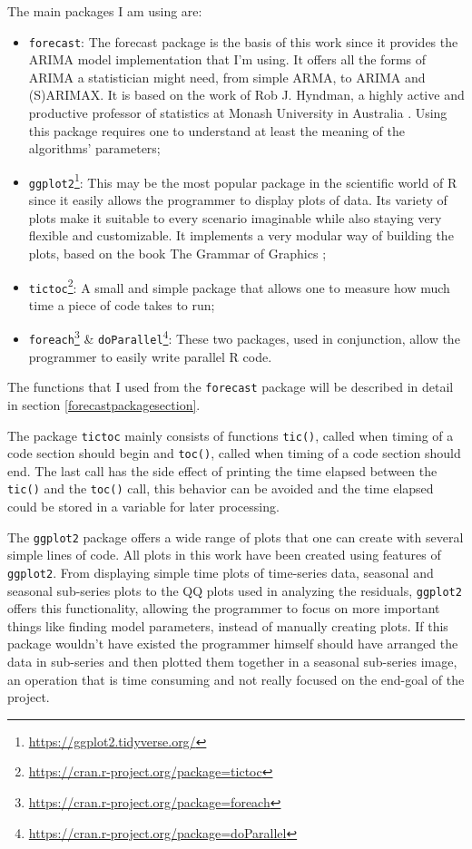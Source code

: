 \documentclass[12pt,a4paper,titlepage]{report}
\begin{document}
The main packages I am using are: 
\begin{itemize}
    \item \texttt{forecast}: The forecast package is the basis of this work since it provides the ARIMA model implementation that I'm using. It offers all the forms of ARIMA a statistician might need, from simple ARMA, to ARIMA and (S)ARIMAX. It is based on the work of Rob J. Hyndman, a highly active and productive professor of statistics at Monash University in Australia \cite{forecastpackagearticle} \cite{rforecastpackage}. Using this package requires one to understand at least the meaning of the algorithms' parameters;
    \item \texttt{ggplot2}\footnote{\url{https://ggplot2.tidyverse.org/}}: This may be the most popular package in the scientific world of R since it easily allows the programmer to display plots of data. Its variety of plots make it suitable to every scenario imaginable while also staying very flexible and customizable. It implements a very modular way of building the plots, based on the book The Grammar of Graphics \cite{thegrammarofgraphics};
    \item \texttt{tictoc}\footnote{\url{https://cran.r-project.org/package=tictoc}}: A small and simple package that allows one to measure how much time a piece of code takes to run;
    \item \texttt{foreach}\footnote{\url{https://cran.r-project.org/package=foreach}} \& \texttt{doParallel}\footnote{\url{https://cran.r-project.org/package=doParallel}}: These two packages, used in conjunction, allow the programmer to easily write parallel R code.
\end{itemize}

The functions that I used from the \texttt{forecast} package will be described in detail in section \ref{forecastpackagesection}.

The package \texttt{tictoc} mainly consists of functions \texttt{tic()}, called when timing of a code section should begin and \texttt{toc()}, called when timing of a code section should end. The last call has the side effect of printing the time elapsed between the \texttt{tic()} and the \texttt{toc()} call, this behavior can be avoided and the time elapsed could be stored in a variable for later processing.

The \texttt{ggplot2} package offers a wide range of plots that one can create with several simple lines of code. All plots in this work have been created using features of \texttt{ggplot2}. From displaying simple time plots of time-series data, seasonal and seasonal sub-series plots to the QQ plots used in analyzing the residuals, \texttt{ggplot2} offers this functionality, allowing the programmer to focus on more important things like finding model parameters, instead of manually creating plots. If this package wouldn't have existed the programmer himself should have arranged the data in sub-series and then plotted them together in a seasonal sub-series image, an operation that is time consuming and not really focused on the end-goal of the project.
\end{document}
